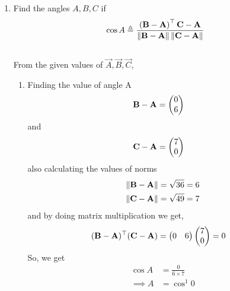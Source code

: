 \documentclass[11pt]{book}
\begin{document}
\begin{enumerate}[label=\thesection.\arabic*.,ref=\thesection.\theenumi]
\item Find the angles $A, B, C$ if 
    \label{prop:angle2d}
  \begin{align}
    \label{eq:angle2d}
   \cos A \triangleq 
\frac{\brak{\vec{B}-\vec{A}}^{\top}{\vec{C}-\vec{A}}}{\norm{\vec{B}-\vec{A}}\norm{\vec{C}-\vec{A}}}
  \end{align}
\solution\\
From the given values of $\vec{A},\vec{B},\vec{C}$,\\
\begin{enumerate}
 \item Finding the value of angle A
\begin{align}
 \mathbf{B}-\mathbf{A} &=\begin{pmatrix}0\\6\end{pmatrix}
\end{align}
and 
\begin{align}
 \mathbf{C}-\mathbf{A} &= \begin{pmatrix}7\\0\end{pmatrix}
\end{align}
also calculating the values of norms
\begin{align}
 \left\lVert\mathbf{B}-\mathbf{A}\right\rVert &= \sqrt{36} = 6 \\
 \left\lVert\mathbf{C}-\mathbf{A}\right\rVert &= \sqrt{49} = 7 \\
\end{align}
and by doing matrix multiplication we get,
\begin{align}
\begin{split}
 (\mathbf{B}-\mathbf{A})^{\top}(\mathbf{C}-\mathbf{A}) &= \begin{pmatrix}0 & 6\end{pmatrix}\begin{pmatrix}7\\0\end{pmatrix} = 0
\end{split}
\end{align}
So, we get
\begin{align}
 \cos{A} &= \frac{0}{6\times 7}\\
 \implies A& = \cos^{1}{0}
\end{align}


\end{enumerate}
\end{enumerate}
\end{document}
